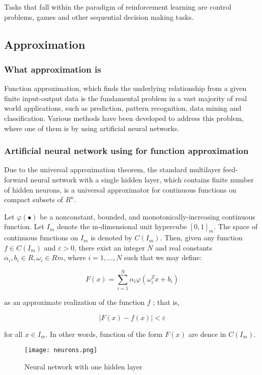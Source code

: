 \documentclass[a4paper,12pt]{article}
\begin{document}
Tasks that fall within the paradigm of reinforcement learning are control problems, games and other sequential decision making tasks.

\subsection{Approximation}
\subsubsection{What approximation is}

Function approximation, which finds the underlying relationship from a given finite input-output data is the fundamental problem in a vast majority of real world applications, such as prediction, pattern recognition, data mining and classification. Various methods have been developed to address this problem, where one of them is by using artificial neural networks.

\subsubsection{Artificial neural network using for function approximation}

Due to the universal approximation theorem, the standard multilayer feed-forward neural network with a single hidden layer, which contains finite number of hidden neurons, is a universal approximator for continuous functions on compact subsets of $R^n$.

Let $\varphi(\bullet) $ be a nonconstant, bounded, and monotonically-increasing continuous function. Let $I_m$ denote the m-dimensional unit hypercube $ [0,1]_m. $ The space of continuous functions on $ I_m $ is denoted by $C(I_m)$. Then, given any function $ f \in C(I_m) $ and $ \varepsilon > 0 $, there exist an integer $ N $ and real constants $ \alpha_i, b_i \in R, \omega_i \in Rm $, where $ i = 1, \hdots, N $ such that we may define:

\begin{equation}
 F(x) = \sum\limits_{i=1}^N\alpha_i\varphi(\omega_i^Tx+b_i) 
\end{equation}

as an approximate realization of the function $ f $ ; that is,

\begin{equation}
 |F(x)-f(x)|<\varepsilon
\end{equation}

for all $ x \in I_m$. In other words, function of the form $ F(x) $ are dence in $ C(I_m) $.   
\begin{figure}[ht]
 \centering
 \texttt{[image: neurons.png]}
 \caption{Neural network with one hidden layer}
\end{figure}
\end{document}
